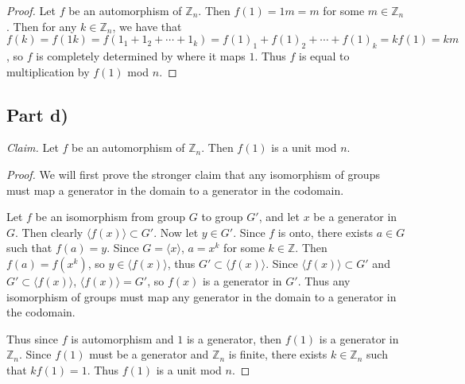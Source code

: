 \documentclass{abrice}
\newcommand{\Z}{\mathbb{Z}}
\newcommand{\Claim}{\emph{Claim.}\xspace}%
\begin{document}
\begin{proof}
  Let $f$ be an automorphism of $\Z_n$. Then $f(1) = 1m = m$ for some $m \in
  \Z_n$. Then for any $k \in \Z_n$, we have that $f(k) = f(1k) = f(1_1 + 1_2 +
  \cdots + 1_k) = {f(1)}_1 + {f(1)}_2 + \cdots + {f(1)}_k = k f(1) = km$, so $f$
  is completely determined by where it maps $1$. Thus $f$ is equal to
  multiplication by $f(1)$ mod $n$.
\end{proof}

\subsection{Part d)}

\Claim Let $f$ be an automorphism of $\Z_n$. Then $f(1)$ is a unit mod $n$.

\begin{proof}
  We will first prove the stronger claim that any isomorphism of groups must map
  a generator in the domain to a generator in the codomain.

  Let $f$ be an isomorphism from group $G$ to group $G'$, and let $x$ be a
  generator in $G$. Then clearly $\langle f(x) \rangle \subset G'$. Now let $y
  \in G'$. Since $f$ is onto, there exists $a \in G$ such that $f(a) = y$. Since
  $G = \langle x \rangle$, $a = x^k$ for some $k \in \Z$. Then $f(a) = f(x^k)$,
  so $y \in \langle f(x) \rangle$, thus $G' \subset \langle f(x) \rangle$. Since
  $\langle f(x) \rangle \subset G'$ and $G' \subset \langle f(x) \rangle$,
  $\langle f(x) \rangle = G'$, so $f(x)$ is a generator in $G'$. Thus any
  isomorphism of groups must map any generator in the domain to a generator in
  the codomain.

  Thus since $f$ is automorphism and $1$ is a generator, then $f(1)$ is a
  generator in $\Z_n$. Since $f(1)$ must be a generator and $\Z_n$ is finite,
  there exists $k \in \Z_n$ such that $kf(1) = 1$. Thus $f(1)$ is a unit mod $n$.
\end{proof}
\end{document}
